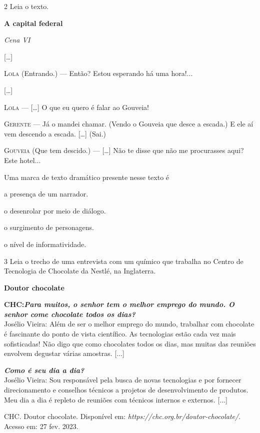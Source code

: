 \num{2} Leia o texto.

\begin{myquote}
\textbf{A capital federal}

\textit{Cena VI}

{[}\ldots{}{]}

\textsc{Lola} (Entrando.) --- Então? Estou esperando há uma hora!...

{[}\ldots{}{]}

\textsc{Lola} --- {[}\ldots{}{]} O que eu quero é falar ao Gouveia!

\textsc{Gerente} --- Já o mandei chamar. (Vendo o Gouveia que desce a escada.)
E ele aí vem descendo a escada. {[}\ldots{}{]} (Sai.)

\textsc{Gouveia} (Que tem descido.) --- {[}\ldots{}{]} Não te disse que não me
procurasses aqui? Este hotel...

\end{myquote}

Uma marca de texto dramático presente nesse texto é

\begin{escolha}
\item a presença de um narrador.

\item o desenrolar por meio de diálogo.

\item o surgimento de personagens.

\item o nível de informatividade.
\end{escolha}

\num{3} Leia o trecho de uma entrevista com um químico que
trabalha no Centro de Tecnologia de Chocolate da Nestlé, na Inglaterra.

\begin{myquote}
\textbf{Doutor chocolate}

\textbf{CHC:\emph{Para muitos, o senhor tem o melhor emprego do mundo.
O senhor come chocolate todos os dias?}}\\
Josélio Vieira: Além de ser o melhor emprego do mundo, trabalhar com
chocolate é fascinante do ponto de vista científico. As tecnologias
estão cada vez mais sofisticadas! Não digo que como chocolates todos os
dias, mas muitas das reuniões envolvem degustar várias amostras.
{[}...{]}

\emph{\textbf{Como é seu dia a dia?}}\\
Josélio Vieira: Sou responsável pela busca de novas tecnologias e por fornecer
direcionamento e conselhos técnicos a projetos de desenvolvimento de
produtos. Meu dia a dia é repleto de reuniões com técnicos internos e
externos. {[}...{]}

CHC. Doutor chocolate. Disponível em:
\emph{https://chc.org.br/doutor-chocolate/}. Acesso em: 27 fev. 2023.
\end{myquote}

